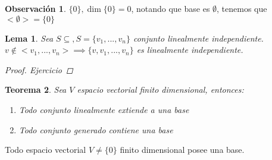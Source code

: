 \documentclass[11pt]{book}
\newtheorem{thm}{Teorema}[section]
\newtheorem{lem}[thm]{Lema}
\theoremstyle{definition}
\newtheorem{obs}{Observación}[section]
\begin{document}
\begin{obs}
	$\{0\}, \dim\{0\}=0$, notando que base es $\emptyset$, tenemos que $<\emptyset>=\{0\}$
\end{obs}
\begin{lem}
	Sea $S\subseteq , S=\{v_1,...,v_n\}$ conjunto linealmente independiente.\\
	$v\notin<v_1,...,v_n>\implies\{v,v_1,...,v_n\}$ es linealmente independiente.
	\begin{proof}
		Ejercicio
	\end{proof}
\end{lem}

\begin{thm}
	Sea $V$ espacio vectorial finito dimensional, entonces:
	\begin{enumerate}
		\item Todo conjunto linealmente extiende a una base

		\item Todo conjunto generado contiene una base
	\end{enumerate}

\end{thm}
Todo espacio vectorial $V\neq\{0\}$ finito dimensional posee una base.
\end{document}
